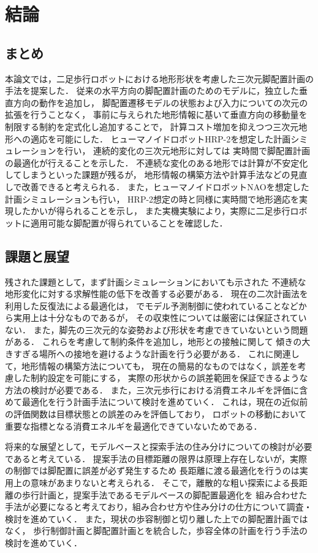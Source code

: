 \documentclass[autodetect-engine,dvipdfmx-if-dvi,ja=standard,a4j,jbase=11pt,magstyle=nomag*]{bxjsreport}
\begin{document}
\chapter{結論}

\section{まとめ}
本論文では，二足歩行ロボットにおける地形形状を考慮した三次元脚配置計画の手法を提案した．
従来の水平方向の脚配置計画のためのモデルに，独立した垂直方向の動作を追加し，
脚配置遷移モデルの状態および入力についての次元の拡張を行うことなく，
事前に与えられた地形情報に基いて垂直方向の移動量を制限する制約を定式化し追加することで，
計算コスト増加を抑えつつ三次元地形への適応を可能にした．
ヒューマノイドロボットHRP-2を想定した計画シミュレーションを行い，
連続的変化の三次元地形に対しては
実時間で脚配置計画の最適化が行えることを示した．
不連続な変化のある地形では計算が不安定化してしまうといった課題が残るが，
地形情報の構築方法や計算手法などの見直しで改善できると考えられる．
また，ヒューマノイドロボットNAOを想定した計画シミュレーションも行い，
HRP-2想定の時と同様に実時間で地形適応を実現したかいが得られることを示し，
また実機実験により，実際に二足歩行ロボットに適用可能な脚配置が得られていることを確認した．

% 
\section{課題と展望}
残された課題として，まず計画シミュレーションにおいても示された
不連続な地形変化に対する求解性能の低下を改善する必要がある．
現在の二次計画法を利用した反復法による最適化は，
\cite{maciejowski_2005jp}でモデル予測制御に使われていることなどから実用上は十分なものであるが，
その収束性については厳密には保証されていない\cite{yabe_1999}．
また，脚先の三次元的な姿勢および形状を考慮できていないという問題がある．
これらを考慮して制約条件を追加し，地形との接触に関して
傾きの大きすぎる場所への接地を避けるような計画を行う必要がある．
これに関連して，地形情報の構築方法についても，
現在の簡易的なものではなく，誤差を考慮した制約設定を可能にする，
実際の形状からの誤差範囲を保証できるような方法の検討が必要である．
また，三次元歩行における消費エネルギを評価に含めて最適化を行う計画手法について検討を進めていく．
これは，現在の近似前の評価関数は目標状態との誤差のみを評価しており，
ロボットの移動において重要な指標となる消費エネルギを最適化できていないためである．

将来的な展望として，モデルベースと探索手法の住み分けについての検討が必要であると考えている．
提案手法の目標距離の限界は原理上存在しないが，実際の制御では脚配置に誤差が必ず発生するため
長距離に渡る最適化を行うのは実用上の意味があまりないと考えられる．
そこで，離散的な粗い探索による長距離の歩行計画と，提案手法であるモデルベースの脚配置最適化を
組み合わせた手法が必要になると考えており，組み合わせ方や住み分けの仕方について調査・検討を進めていく．
また，現状の歩容制御と切り離した上での脚配置計画ではなく，
歩行制御計画と脚配置計画とを統合した，歩容全体の計画を行う手法の検討を進めていく．
\end{document}
